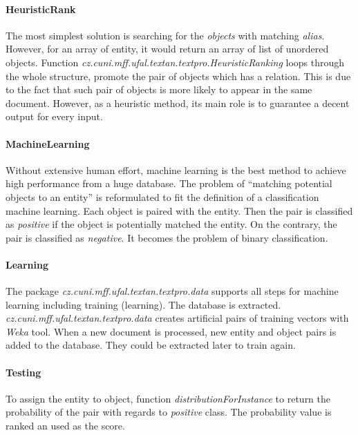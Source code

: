 \paragraph{HeuristicRank}
The most simplest solution is searching for the \textit{objects} with matching 
\textit{alias}. However, for an array of entity, it would return an array of 
list of unordered objects.
Function \emph{cz.cuni.mff.ufal.textan.textpro.HeuristicRanking} loops through 
the whole structure, promote the pair of objects which has a relation. This is 
due to the fact that such pair of objects is more likely to appear in the same
document. However, as a heuristic method, its main role is to guarantee a decent
output for every input.


\paragraph{MachineLearning}
Without extensive human effort, machine learning is the best method to achieve
high performance from a huge database. The problem of ``matching potential objects
to an entity'' is reformulated to fit the definition of a classification machine 
learning. Each object is paired with the entity. Then the pair is classified as
\emph{positive} if the object is potentially matched the entity. On the contrary,
the pair is classified as \emph{negative}. It becomes the problem of binary 
classification.

\paragraph{Learning}
The package \emph{cz.cuni.mff.ufal.textan.textpro.data} supports all steps for machine
learning including training (learning). The database is extracted. 
\emph{cz.cuni.mff.ufal.textan.textpro.data} creates 
artificial pairs of training vectors with \textit{Weka} tool. When a new document is
processed, new entity and object pairs is added to the database. They could be extracted
later to train again.

\paragraph{Testing}
To assign the entity to object, function \emph{distributionForInstance} to return the 
probability of the pair with regards to \emph{positive} class. The probability value 
is ranked an used as the score.

